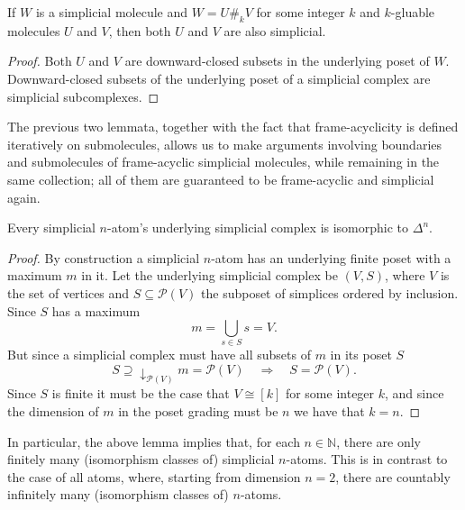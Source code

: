 \documentclass[12pt,a4paper]{article}
\numberwithin{equation}{section}
\begin{document}
\begin{lemma}
    If $W$ is a simplicial molecule and $W = U \#_k V$ for some integer $k$ and $k$-gluable molecules $U$ and $V$, then both $U$ and $V$ are also simplicial.
\end{lemma}

\begin{proof}
    Both  $U$ and $V$ are downward-closed subsets in the underlying poset of $W$. Downward-closed subsets of the underlying poset of a simplicial complex are simplicial subcomplexes.
\end{proof}

\begin{remark}
    The previous two lemmata, together with the fact that frame-acyclicity is defined iteratively on submolecules, allows us to make arguments involving boundaries and submolecules of frame-acyclic simplicial molecules, while remaining in the same collection; all of them are guaranteed to be frame-acyclic and simplicial again.
\end{remark}

\begin{lemma}\label{lem:simp_atoms_are_simplices}
    Every simplicial $n$-atom's underlying simplicial complex is isomorphic to $\Delta^n$.
\end{lemma}

\begin{proof}
    By construction a simplicial $n$-atom has an underlying finite poset with a maximum $m$ in it. Let the underlying simplicial complex be $(V, S)$, where $V$ is the set of vertices and $S \subseteq \mathscr{P}(V)$ the subposet of simplices ordered by inclusion. Since $S$ has a maximum
    \begin{equation}
        m = \bigcup_{s \in S} s = V.
    \end{equation}
    But since a simplicial complex must have all subsets of $m$ in its poset $S$
    \begin{equation}
        S \supseteq \downarrow_{\mathscr{P}(V)} m = \mathscr{P}(V) \quad \Rightarrow \quad S = \mathscr{P}(V).
    \end{equation}
    Since $S$ is finite it must be the case that $V \cong [k]$ for some integer $k$, and since the dimension of $m$ in the poset grading must be $n$ we have that $k=n$.
\end{proof}


\begin{remark}
    In particular, the above lemma implies that, for each $n \in \mathbb{N}$, there are only finitely many (isomorphism classes of) simplicial $n$-atoms. This is in contrast to the case of all atoms, where, starting from dimension $n=2$, there are countably infinitely many (isomorphism classes of) $n$-atoms.
\end{remark}
\end{document}
